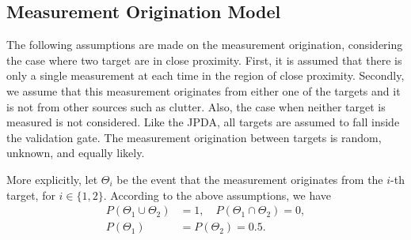\documentclass[letterpaper, 10pt, conference]{ieeeconf}
\newcommand{\EditTL}[1]{{\color{red}\protect #1}}
\begin{document}

\subsection{Measurement Origination Model}
\label{DAP}


The following assumptions are made on the measurement origination, considering the case where two target are in close proximity. First, it is assumed that there is only a single measurement at each time in the region of close proximity. Secondly, we assume that this measurement originates from either one of the targets and it is not from other sources such as clutter. Also, the case when neither target is measured is not considered. Like the JPDA, all targets are assumed to fall inside the validation gate. The measurement origination between targets is random, unknown, and equally likely. 

More explicitly, let $\Theta_i$ be the event that the measurement originates from the $i$-th target, for $i\in\{1,2\}$. According to the above assumptions, we have
\begin{align}
P(\Theta_1\cup \Theta_2)&=1,\quad
P(\Theta_1\cap \Theta_2)=0,\\
P(\Theta_1)&=P(\Theta_2)=0.5.\label{eqn:MeaOrig}
\end{align}

%
\end{document}
